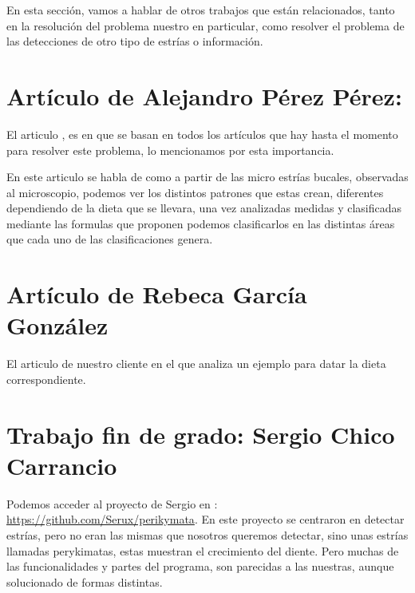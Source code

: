 
En esta sección, vamos a hablar de otros trabajos que están relacionados, tanto en la resolución del problema nuestro en particular, como resolver el problema de las detecciones de otro tipo de estrías o información.

\section{Artículo de Alejandro Pérez Pérez:}
El articulo \cite{perez:perez}, es en que se basan en todos los artículos que hay hasta el momento para resolver este problema, lo mencionamos por esta importancia.

En este articulo se habla de como a partir de las micro estrías bucales, observadas al microscopio, podemos ver los distintos patrones que estas crean, diferentes dependiendo de la dieta que se llevara, una vez analizadas medidas y clasificadas mediante las formulas que proponen podemos clasificarlos en las distintas áreas que cada uno de las clasificaciones genera.

\section{Artículo de Rebeca García González}
El articulo \cite{Rebeca:garcia} de nuestro cliente en el que analiza un ejemplo para datar la dieta correspondiente.

\section{Trabajo fin de grado: Sergio Chico Carrancio}
Podemos acceder al proyecto de Sergio en : \url{https://github.com/Serux/perikymata}.
En este proyecto se centraron en detectar estrías, pero no eran las mismas que nosotros queremos detectar, sino unas estrías llamadas perykimatas, estas muestran el crecimiento del diente. Pero muchas de las funcionalidades y partes del programa, son parecidas a las nuestras, aunque solucionado de formas distintas.

